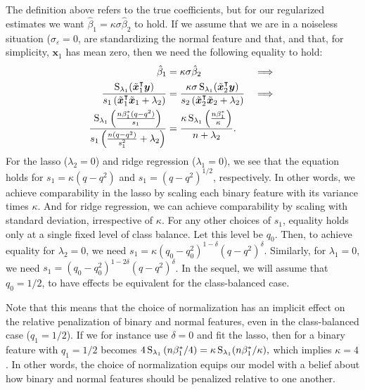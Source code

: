 The definition above refers to the true coefficients, but for our regularized estimates we
want \(\hat{\beta}_1 = \kappa\sigma\hat{\beta}_2\) to hold. If we assume that we are in a
noiseless situation (\(\sigma_\varepsilon = 0\), are standardizing the normal feature and
that, and that, for simplicity, \(\bm{x}_1\) has mean zero, then we need the following
equality to hold:
%
\begin{align}
  \label{eq:comparable-effects}
  \hat{\beta}_1                                                                                                                          & = \kappa\sigma \hat{\beta}_2                                                                                                                         & \implies \nonumber \\
  \frac{\operatorname{S}_{\lambda_1}(\tilde{\boldsymbol{x}}_1^\intercal \boldsymbol{y})}{s_1\left(\tilde{\boldsymbol{x}}_1^\intercal \tilde{\boldsymbol{x}}_1 + \lambda_2\right)} & =\frac{\kappa\sigma \operatorname{S}_{\lambda_1}(\tilde{\boldsymbol{x}}_2^\intercal \boldsymbol{y})}{s_2\left(\tilde{\boldsymbol{x}}_2^\intercal \tilde{\boldsymbol{x}}_2 + \lambda_2\right)} & \implies \nonumber \\
  \frac{\operatorname{S}_{\lambda_1}\left(\frac{n\beta_1^* (q - q^2)}{s_1}\right)}{s_1\left(\frac{n(q - q^2)}{s_1^2} + \lambda_2\right)}              & =  \frac{\kappa \operatorname{S}_{\lambda_1}\left(\frac{n\beta_1^*}{\kappa} \right)}{n + \lambda_2}.                                                              &
\end{align}
%
For the lasso (\(\lambda_2 = 0\)) and ridge regression (\(\lambda_1=0\)), we see that the
equation holds for \(s_1 = \kappa (q - q^2)\) and \(s_1 = (q - q^2)^{1/2}\), respectively.
In other words, we achieve comparability in the lasso by scaling each binary feature with
its variance times \(\kappa\). And for ridge regression, we can achieve comparability by
scaling with standard deviation, irrespective of \(\kappa\). For any other choices of
\(s_1\), equality holds only at a single fixed level of class balance. Let this level be
\(q_0\). Then, to achieve equality for \(\lambda_2 = 0\), we need \(s_1 =\kappa (q_0 -
q_0^2)^{1 - \delta}(q - q^2)^\delta\). Similarly, for \(\lambda_1 = 0\), we need \(s_1 =
(q_0 - q_0^2)^{1 - 2\delta} (q - q^2)^\delta\). In the sequel, we will assume that \(q_0 =
1/2\), to have effects be equivalent for the class-balanced case.

Note that this means that the choice of normalization has an implicit effect on the
relative penalization of binary and normal features, even in the class-balanced case (\(q_1
= 1/2\)). If we for instance use \(\delta=0\) and fit the lasso, then
 for a binary feature with \(q_1=1/2\) becomes
\(4\operatorname{S}_{\lambda_1}\left(n\beta_1^*/4\right) = \kappa \operatorname{S}_{\lambda_1}(n\beta_1^*/\kappa ),\)
which implies \(\kappa = 4\). In other words, the choice of normalization equips our model
with a belief about how binary and normal features should be penalized relative to one
another.

